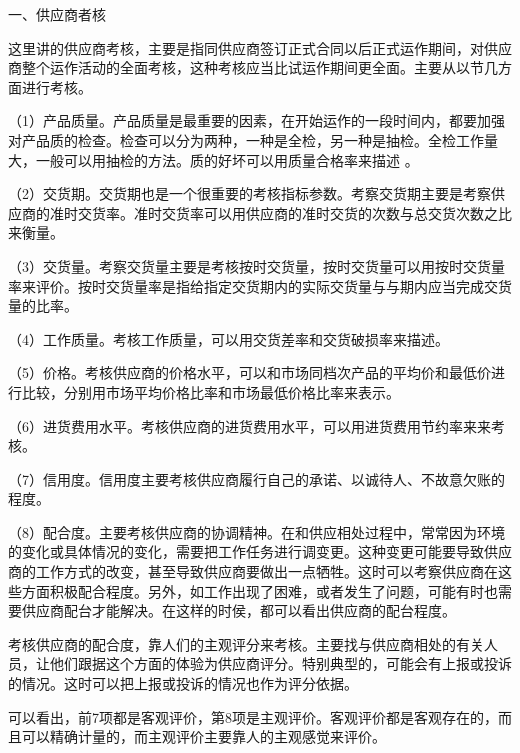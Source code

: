 一、供应商者核

    这里讲的供应商考核，主要是指同供应商签订正式合同以后正式运作期间，对供应商整个运作活动的全面考核，这种考核应当比试运作期间更全面。主要从以节几方面进行考核。

    （1）产品质量。产品质量是最重要的因素，在开始运作的一段时间内，都要加强对产品质的检查。检查可以分为两种，一种是全检，另一种是抽检。全检工作量大，一般可以用抽检的方法。质的好坏可以用质量合格率来描述 。

    （2）交货期。交货期也是一个很重要的考核指标参数。考察交货期主要是考察供应商的准时交货率。准时交货率可以用供应商的准时交货的次数与总交货次数之比来衡量。

    （3）交货量。考察交货量主要是考核按时交货量，按时交货量可以用按时交货量率来评价。按时交货量率是指给指定交货期内的实际交货量与与期内应当完成交货量的比率。

    （4）工作质量。考核工作质量，可以用交货差率和交货破损率来描述。

    （5）价格。考核供应商的价格水平，可以和市场同档次产品的平均价和最低价进行比较，分别用市场平均价格比率和市场最低价格比率来表示。

    （6）进货费用水平。考核供应商的进货费用水平，可以用进货费用节约率来来考核。

    （7）信用度。信用度主要考核供应商履行自己的承诺、以诚待人、不故意欠账的程度。

    （8）配合度。主要考核供应商的协调精神。在和供应相处过程中，常常因为环境的变化或具体情况的变化，需要把工作任务进行调变更。这种变更可能要导致供应商的工作方式的改变，甚至导致供应商要做出一点牺牲。这时可以考察供应商在这些方面积极配合程度。另外，如工作出现了困难，或者发生了问题，可能有时也需要供应商配台才能解决。在这样的时侯，都可以看出供应商的配台程度。

    考核供应商的配合度，靠人们的主观评分来考核。主要找与供应商相处的有关人员，让他们跟据这个方面的体验为供应商评分。特别典型的，可能会有上报或投诉的情况。这时可以把上报或投诉的情况也作为评分依据。

    可以看出，前7项都是客观评价，第8项是主观评价。客观评价都是客观存在的，而且可以精确计量的，而主观评价主要靠人的主观感觉来评价。
